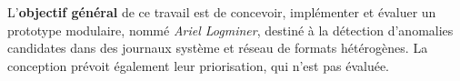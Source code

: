 
L'\textbf{objectif général} de ce travail est de concevoir, implémenter et évaluer un prototype modulaire, nommé \textit{Ariel Logminer}, destiné à la détection d'anomalies candidates dans des journaux système et réseau de formats hétérogènes. La conception prévoit également leur priorisation, qui n'est pas évaluée.
